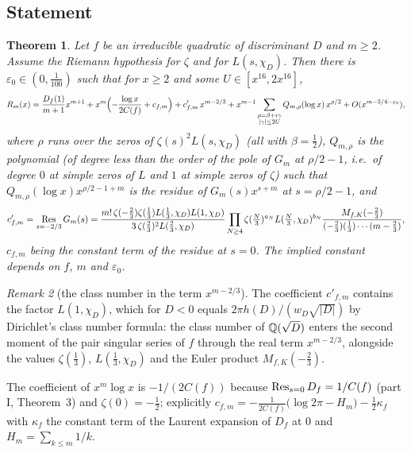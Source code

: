 \documentclass[11pt,a4paper]{article}
\newtheorem{theorem}{Theorem}
\theoremstyle{remark}\newtheorem{remark}[theorem]{Remark}
\begin{document}
\subsection{Statement}

\begin{theorem}\label{thm:explicit-quadratic}
Let $f$ be an irreducible quadratic of discriminant $D$ and $m\ge2$. Assume the Riemann hypothesis for
$\zeta$ and for $L(s,\chi_D)$. Then there is $\varepsilon_0\in(0,\tfrac1{100})$ such that for $x\ge2$ and some
$U\in[x^{16},2x^{16}]$,
\begin{equation}\label{eq:explicit}
R_m(x)=\frac{D_f(1)}{m+1}x^{m+1}+x^m\Bigl(-\frac{\log x}{2C(f)}+c_{f,m}\Bigr)+c'_{f,m}\,x^{m-2/3}
+x^{m-1}\sum_{\substack{\rho=\beta+i\gamma\\|\gamma|\le2U}}Q_{m,\rho}(\log x)\,x^{\rho/2}+O(x^{m-3/4-\varepsilon_0}),
\end{equation}
where $\rho$ runs over the zeros of $\zeta(s)^2L(s,\chi_D)$ (all with $\beta=\tfrac12$), $Q_{m,\rho}$ is the
polynomial (of degree less than the order of the pole of $G_m$ at $\rho/2-1$, i.e.\ of degree $0$ at simple
zeros of $L$ and $1$ at simple zeros of $\zeta$) such that $Q_{m,\rho}(\log x)x^{\rho/2-1+m}$ is the residue
of $G_m(s)x^{s+m}$ at $s=\rho/2-1$, and
\[
c'_{f,m}=\operatorname*{Res}_{s=-2/3}G_m(s)=\frac{m!\,\zeta(-\tfrac23)\zeta(\tfrac13)L(\tfrac13,\chi_D)L(1,\chi_D)}{3\,\zeta(\tfrac23)^2L(\tfrac23,\chi_D)}
\prod_{N\ge4}\zeta(\tfrac N3)^{a_N}L(\tfrac N3,\chi_D)^{b_N}\frac{M_{f,K}(-\tfrac23)}{(-\tfrac23)(\tfrac13)\cdots(m-\tfrac23)},
\]
$c_{f,m}$ being the constant term of the residue at $s=0$. The implied constant depends on $f$, $m$ and
$\varepsilon_0$.
\end{theorem}

\begin{remark}[the class number in the term $x^{m-2/3}$]
The coefficient $c'_{f,m}$ contains the factor $L(1,\chi_D)$, which for $D<0$ equals $2\pi h(D)/(w_D\sqrt{|D|})$
by Dirichlet's class number formula: the class number of $\mathbb{Q}(\sqrt D)$ enters the second moment of the pair
singular series of $f$ through the real term $x^{m-2/3}$, alongside the values $\zeta(\tfrac13)$,
$L(\tfrac13,\chi_D)$ and the Euler product $M_{f,K}(-\tfrac23)$.
\end{remark}

The coefficient of $x^m\log x$ is $-1/(2C(f))$ because $\operatorname*{Res}_{s=0}D_f=1/C(f)$ (part I, Theorem~3) and
$\zeta(0)=-\tfrac12$; explicitly $c_{f,m}=-\frac1{2C(f)}\bigl(\log2\pi-H_m\bigr)-\tfrac12\kappa_f$ with
$\kappa_f$ the constant term of the Laurent expansion of $D_f$ at $0$ and $H_m=\sum_{k\le m}1/k$.
\end{document}
